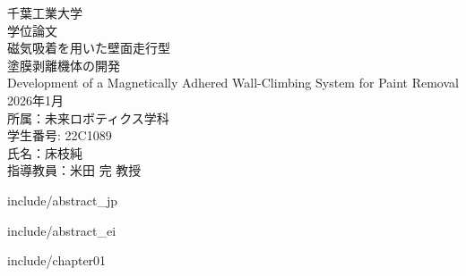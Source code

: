 \documentclass[11pt,dvipdfmx]{jsarticle}
\begin{document}
\begin{titlepage}
  \begin{center}

    \vspace{20mm}
    {\Large 千葉工業大学}\\
    \vspace{5mm}
    {\Large 学位論文}\\
		\vspace{65mm}
    {\huge 磁気吸着を用いた壁面走行型\\\vspace{5mm}塗膜剥離機体の開発}\\
    \vspace{3mm}
    {\Large Development of a Magnetically Adhered Wall-Climbing System for Paint Removal}\\
    \vspace{65mm}
		{\Large 2026年1月}\\
    \vspace{10mm}
    {\Large 所属：未来ロボティクス学科}\\
    \vspace{5mm}
    {\Large 学生番号: 22C1089}\\
    {\Large 氏名：床枝純}\\
    \vspace{5mm}
    {\Large 指導教員：米田 完 教授}
    
  \end{center}

\end{titlepage}

\pagestyle{empty}

  {include/abstract_jp}

\newpage

  {include/abstract_ei}

\newpage

\pagestyle{fancy}
\renewcommand{\footrulewidth}{0.4pt}%
\tableofcontents

\vspace{5mm}


\newpage
\listoffigures
\listoftables

\clearpage
\setcounter{page}{1}

  {include/chapter01}
\end{document}
